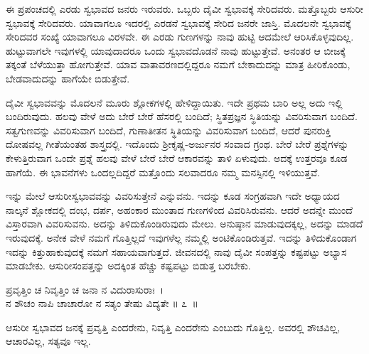 ಈ ಪ್ರಪಂಚದಲ್ಲಿ ಎರಡು ಸ್ವಭಾವದ ಜನರು ಇರುವರು. ಒಬ್ಬರು ದೈವೀ ಸ್ವಭಾವಕ್ಕೆ ಸೇರಿದವರು. ಮತ್ತೊಬ್ಬರು ಆಸುರೀ ಸ್ವಭಾವಕ್ಕೆ ಸೇರಿದವರು. ಯಾವಾಗಲೂ ಇದರಲ್ಲಿ ಎರಡನೆ ಸ್ವಭಾವಕ್ಕೆ ಸೇರಿದ ಜನರೇ ಜಾಸ್ತಿ. ಮೊದಲನೇ ಸ್ವಭಾವಕ್ಕೆ ಸೇರಿದವರ ಸಂಖ್ಯೆ ಯಾವಾಗಲೂ ವಿರಳವೇ. ಈ ಎರಡು ಗುಣಗಳನ್ನು ನಾವು ಹುಟ್ಟಿ ಆದಮೇಲೆ ಆರಿಸಿಕೊಳ್ಳವುದಿಲ್ಲ. ಹುಟ್ಟುವಾಗಲೇ ಇವುಗಳಲ್ಲಿ ಯಾವುದಾದರೂ ಒಂದು ಸ್ವಭಾವದೊಡನೆ ನಾವು ಹುಟ್ಟುತ್ತೇವೆ. ಅನಂತರ ಆ ಬೀಜಕ್ಕೆ ತಕ್ಕಂತೆ ಬೆಳೆಯುತ್ತಾ ಹೋಗುತ್ತೇವೆ. ಯಾವ ವಾತಾವರಣದಲ್ಲಿದ್ದರೂ ನಮಗೆ ಬೇಕಾದುದನ್ನು ಮಾತ್ರ ಹೀರಿಕೊಂಡು, ಬೇಡವಾದುದನ್ನು ಹಾಗೆಯೇ ಬಿಡುತ್ತೇವೆ.

ದೈವೀ ಸ್ವಭಾವವನ್ನು ಮೊದಲನೆ ಮೂರು ಶ್ಲೋಕಗಳಲ್ಲಿ ಹೇಳಿದ್ದಾಯಿತು. ಇದೇ ಪ್ರಥಮ ಬಾರಿ ಅಲ್ಲ ಅದು ಇಲ್ಲಿ ಬಂದಿರುವುದು. ಹಲವು ವೇಳೆ ಅದು ಬೇರೆ ಬೇರೆ ಹೆಸರಲ್ಲಿ ಬಂದಿದೆ; ಸ್ಥಿತಪ್ರಜ್ಞನ ಸ್ಥಿತಿಯನ್ನು ವಿವರಿಸುವಾಗ ಬಂದಿದೆ. ಸತ್ವಗುಣವನ್ನು ವಿವರಿಸುವಾಗ ಬಂದಿದೆ, ಗುಣಾತೀತನ ಸ್ಥಿತಿಯನ್ನು ವಿವರಿಸುವಾಗ ಬಂದಿದೆ, ಆದರೆ ಪುನರುಕ್ತಿ ದೋಷವಲ್ಲ ಗೀತೆಯಂತಹ ಶಾಸ್ತ್ರದಲ್ಲಿ. ಇದೊಂದು ಶ‍್ರೀಕೃಷ್ಣ-ಅರ್ಜುನರ ಸಂವಾದ ಗ್ರಂಥ. ಬೇರೆ ಬೇರೆ ಪ್ರಶ್ನೆಗಳನ್ನು ಕೇಳುತ್ತಿರುವಾಗ ಒಂದೇ ಪ್ರಶ್ನೆ ಹಲವು ವೇಳೆ ಬೇರೆ ಬೇರೆ ಆಕಾರವನ್ನು ತಾಳಿ ಏಳುವುದು. ಅದಕ್ಕೆ ಉತ್ತರವೂ ಕೂಡ ಹಾಗೆಯೆ. ಈ ಭಾವನೆಗಳು ಒಂದಲ್ಲದಿದ್ದರೆ ಮತ್ತೊಂದು ಸಲವಾದರೂ ನಮ್ಮ ಮನಸ್ಸಿನಲ್ಲಿ ಇಳಿಯುತ್ತವೆ.

ಇನ್ನು ಮೇಲೆ ಆಸುರೀಸ್ವಭಾವವನ್ನು ವಿವರಿಸುತ್ತೇನೆ ಎನ್ನುವನು. ಇದನ್ನು ಕೂಡ ಸಂಗ್ರಹವಾಗಿ ಇದೇ ಅಧ್ಯಾಯದ ನಾಲ್ಕನೆ ಶ್ಲೋಕದಲ್ಲಿ ದಂಭ, ದರ್ಪ, ಅಹಂಕಾರ ಮುಂತಾದ ಗುಣಗಳಿಂದ ವಿವರಿಸಿರುವನು. ಆದರೆ ಅದನ್ನೇ ಮುಂದೆ ವಿಸ್ತಾರವಾಗಿ ವಿವರಿಸುವನು. ಅದನ್ನು ತಿಳಿದುಕೊಂಡಿರುವುದು ಮೇಲು. ಅನುಷ್ಠಾನ ಮಾಡುವುದಕ್ಕಲ್ಲ, ಅದನ್ನು ಮಾಡದೆ ಇರುವುದಕ್ಕೆ. ಅನೇಕ ವೇಳೆ ನಮಗೆ ಗೊತ್ತಿಲ್ಲದೆ ಇವುಗಳೆಲ್ಲ ನಮ್ಮಲ್ಲಿ ಅಂಟಿಕೊಂಡಿರುತ್ತವೆ. ಇದನ್ನು ತಿಳಿದುಕೊಂಡಾಗ ಇದನ್ನು ಕಿತ್ತುಹಾಕುವುದಕ್ಕೆ ನಮಗೆ ಸಹಾಯವಾಗುತ್ತದೆ. ಜೀವನದಲ್ಲಿ ನಾವು ದೈವೀ ಸಂಪತ್ತನ್ನು ಕಷ್ಟಪಟ್ಟು ಅಭ್ಯಾಸ ಮಾಡಬೇಕು. ಆಸುರೀಸಂಪತ್ತನ್ನು ಅದಕ್ಕಿಂತ ಹೆಚ್ಚು ಕಷ್ಟಪಟ್ಟು ಬಿಡುತ್ತ ಬರಬೇಕು.

\begin{shloka}
ಪ್ರವೃತ್ತಿಂ ಚ ನಿವೃತ್ತಿಂ ಚ ಜನಾ ನ ವಿದುರಾಸುರಾಃ~।\\ನ ಶೌಚಂ ನಾಪಿ ಚಾಚಾರೋ ನ ಸತ್ಯಂ ತೇಷು ವಿದ್ಯತೇ \hfill॥ ೭~॥
\end{shloka}

\begin{artha}
ಆಸುರೀ ಸ್ವಭಾವದ ಜನಕ್ಕೆ ಪ್ರವೃತ್ತಿ ಎಂದರೇನು, ನಿವೃತ್ತಿ ಎಂದರೇನು ಎಂಬುದು ಗೊತ್ತಿಲ್ಲ. ಅವರಲ್ಲಿ ಶೌಚವಿಲ್ಲ, ಆಚಾರವಿಲ್ಲ, ಸತ್ಯವೂ ಇಲ್ಲ.
\end{artha}

